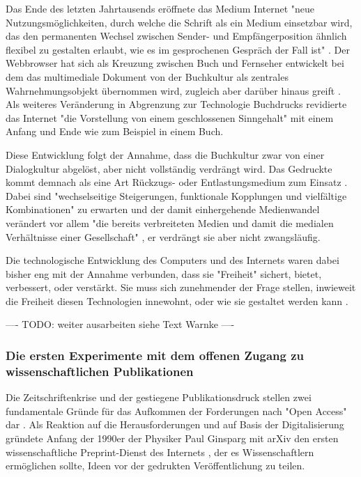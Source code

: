 Das Ende des letzten Jahrtausends eröffnete das Medium Internet "neue Nutzungsmöglichkeiten, durch welche die Schrift als ein Medium einsetzbar wird, das den permanenten Wechsel zwischen Sender- und Empfängerposition ähnlich flexibel zu gestalten erlaubt, wie es im gesprochenen Gespräch der Fall ist" \cite{sandbothe_2000_pragmatische}.  Der Webbrowser hat sich als Kreuzung zwischen Buch und Fernseher entwickelt bei dem das multimediale Dokument von der Buchkultur als zentrales Wahrnehmungsobjekt übernommen wird, zugleich aber darüber hinaus greift \cite{Warnke_2011}. Als weiteres Veränderung in Abgrenzung zur Technologie Buchdrucks revidierte das Internet "die Vorstellung von einem geschlossenen Sinngehalt" \cite{sandbothe_2000_pragmatische} mit einem Anfang und Ende wie zum Beispiel in einem Buch.

Diese Entwicklung folgt der Annahme, dass die Buchkultur zwar von einer Dialogkultur abgelöst, aber nicht vollständig verdrängt wird. Das Gedruckte kommt demnach als eine Art Rückzugs- oder Entlastungsmedium zum Einsatz \cite{hagner_2015_sache_buches}. Dabei sind "wechselseitige Steigerungen, funktionale Kopplungen und vielfältige Kombinationen" zu erwarten und der damit einhergehende Medienwandel verändert vor allem "die bereits verbreiteten Medien und damit die medialen Verhältnisse einer Gesellschaft" \cite{Koenen_1997}, er verdrängt sie aber nicht zwangsläufig.

Die technologische Entwicklung des Computers und des Internets waren dabei bisher eng mit der Annahme verbunden, dass sie "Freiheit" sichert, bietet, verbessert, oder verstärkt. Sie muss sich zunehmender der Frage stellen, inwieweit die Freiheit diesen Technologien innewohnt, oder wie sie gestaltet werden kann \cite{kelty_2014_freedom}.

---- TODO: weiter ausarbeiten siehe Text Warnke ----

\subsubsection{Die ersten Experimente mit dem offenen Zugang zu wissenschaftlichen Publikationen}

Die Zeitschriftenkrise und der gestiegene Publikationsdruck stellen zwei fundamentale Gründe für das Aufkommen der Forderungen nach "Open Access" dar \cite{Brintzinger_2010} \cite{suchen}. Als Reaktion auf die Herausforderungen und auf Basis der Digitalisierung gründete Anfang der 1990er der Physiker Paul Ginsparg mit arXiv den ersten wissenschaftliche Preprint-Dienst des Internets \cite{suchen}, der es Wissenschaftlern ermöglichen sollte, Ideen vor der gedrukten Veröffentlichung zu teilen.

